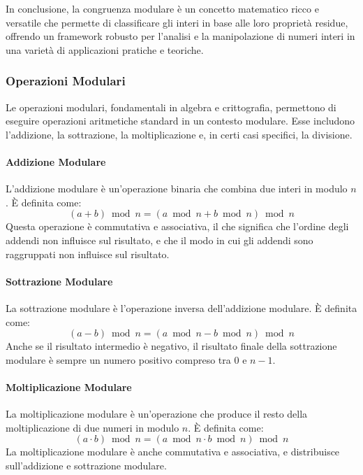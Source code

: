 \documentclass{article}
\theoremstyle{definition}
\begin{document}
In conclusione, la congruenza modulare è un concetto matematico ricco e versatile che permette di classificare gli interi in base alle loro proprietà residue, offrendo un framework robusto per l'analisi e la manipolazione di numeri interi in una varietà di applicazioni pratiche e teoriche.

\subsubsection{Operazioni Modulari}
Le operazioni modulari, fondamentali in algebra e crittografia, permettono di eseguire operazioni aritmetiche standard in un contesto modulare. Esse includono l'addizione, la sottrazione, la moltiplicazione e, in certi casi specifici, la divisione.

\paragraph{Addizione Modulare}
L'addizione modulare è un'operazione binaria che combina due interi in modulo $n$. È definita come:
\begin{equation*}
    (a + b) \bmod n = (a \bmod n + b \bmod n) \bmod n
\end{equation*}
Questa operazione è commutativa e associativa, il che significa che l'ordine degli addendi non influisce sul risultato, e che il modo in cui gli addendi sono raggruppati non influisce sul risultato.

\paragraph{Sottrazione Modulare}
La sottrazione modulare è l'operazione inversa dell'addizione modulare. È definita come:
\begin{equation*}
    (a - b) \bmod n = (a \bmod n - b \bmod n) \bmod n
\end{equation*}
Anche se il risultato intermedio è negativo, il risultato finale della sottrazione modulare è sempre un numero positivo compreso tra $0$ e $n-1$.

\paragraph{Moltiplicazione Modulare}
La moltiplicazione modulare è un'operazione che produce il resto della moltiplicazione di due numeri in modulo $n$. È definita come:
\begin{equation*}
    (a \cdot b) \bmod n = (a \bmod n \cdot b \bmod n) \bmod n
\end{equation*}
La moltiplicazione modulare è anche commutativa e associativa, e distribuisce sull'addizione e sottrazione modulare.
\end{document}
